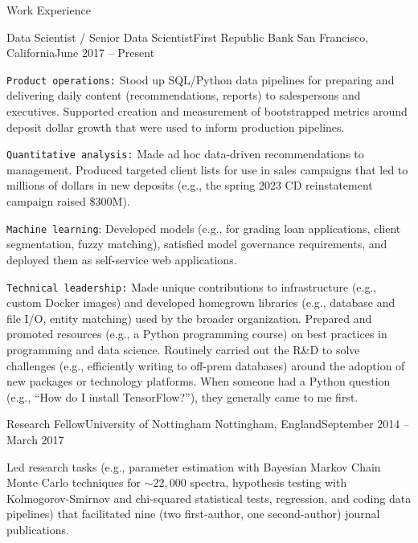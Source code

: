 \documentclass{article}
\newlength{\tabin}
\newlength{\secsep}
\newcommand{\lineunder}{\vspace*{-8pt} \\ \hspace*{-6pt} \hrulefill \\ \vspace*{-15pt}}
\newenvironment{tabbedsection}[1]{
  \begin{list}{}{
      \setlength{\itemsep}{0pt}
      \setlength{\labelsep}{0pt}
      \setlength{\labelwidth}{0pt}
      \setlength{\leftmargin}{\tabin}
      \setlength{\rightmargin}{\tabin}
      \setlength{\listparindent}{0pt}
      \setlength{\parsep}{0pt}
      \setlength{\parskip}{0pt}
      \setlength{\partopsep}{0pt}
      \setlength{\topsep}{#1}
    }
  \item[]
}{\end{list}}
\newenvironment{resume_section}[1]{
  \filbreak
  \vspace{2\secsep}
  \textsc{\large#1}
  \lineunder
  \begin{tabbedsection}{\secsep}
}{\end{tabbedsection}}
\newenvironment{subitems}{
  \renewcommand{\labelitemi}{-}
  \begin{itemize}
      \setlength{\labelsep}{1em}
}{\end{itemize}}
\newenvironment{resume_employer}[4]{
  \vspace{\secsep}
  \textbf{#1} \\ 
  \indent {\small #2} \hfill {\footnotesize#3 (#4)}
  \begin{tabbedsection}{0pt}
  \begin{subitems}
}{\end{subitems}\end{tabbedsection}}
\begin{document}
\begin{resume_section}{Work Experience}

  \begin{resume_employer}{Data Scientist / Senior Data Scientist}{First Republic Bank}
  {San Francisco, California}{June 2017 -- Present}

    \item \texttt{Product operations:} Stood up SQL/Python data pipelines for preparing and delivering daily content (recommendations, reports) to salespersons and executives. Supported creation and measurement of bootstrapped metrics around deposit dollar growth that were used to inform production pipelines.
    \item \texttt{Quantitative analysis:} Made ad hoc data-driven recommendations to management. Produced targeted client lists for use in sales campaigns that led to millions of dollars in new deposits (e.g., the spring 2023 CD reinstatement campaign raised \$300M).
    \item \texttt{Machine learning}: Developed models (e.g., for grading loan applications, client segmentation, fuzzy matching), satisfied model governance requirements, and deployed them as self-service web applications.
    \item \texttt{Technical leadership:} Made unique contributions to infrastructure (e.g., custom Docker images) and developed homegrown libraries (e.g., database and file I/O, entity matching) used by the broader organization. Prepared and promoted resources (e.g., a Python programming course) on best practices in programming and data science. Routinely carried out the R\&D to solve challenges (e.g., efficiently writing to off-prem databases) around the adoption of new packages or technology platforms. When someone had a Python question (e.g., ``How do I install TensorFlow?''), they generally came to me first.
  \end{resume_employer}

  \begin{resume_employer}{Research Fellow}{University of Nottingham}
  {Nottingham, England}{September 2014 -- March 2017}
    \item Led research tasks (e.g., parameter estimation with Bayesian Markov Chain Monte Carlo techniques for $\sim22,000$ spectra, hypothesis testing with Kolmogorov-Smirnov and chi-squared statistical tests, regression, and coding data pipelines) that facilitated nine (two first-author, one second-author) journal publications.
  \end{resume_employer}


\end{resume_section}
\end{document}
